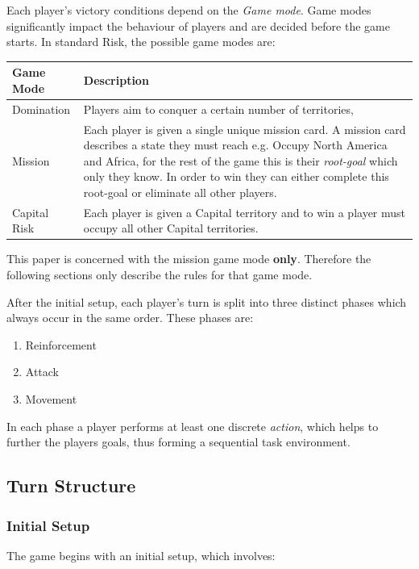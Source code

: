 \documentclass[parskip]{cs4rep}
\begin{document}
Each player’s victory conditions depend on the \textit{Game mode}. Game modes significantly impact the behaviour of players and are decided before the game starts. In standard Risk, the possible game modes are:
\newline

\begin{tabular}{|l|p{11cm}|}
\hline 
\textbf{Game Mode} & \textbf{Description} \\ 
\hline 
Domination & Players aim to conquer a certain number of territories, \\ 
\hline 
Mission & Each player is given a single unique mission card. A mission card describes a state they must reach e.g. Occupy North America and Africa, for the rest of the game this is their \textit{root-goal} which only they know. In order to win they can either complete this root-goal or eliminate all other players. \\ 
\hline 
Capital Risk & Each player is given a Capital territory and to win a player must occupy all other Capital territories. \\ 
\hline
\end{tabular} 

This paper is concerned with the mission game mode \textbf{only}. Therefore the following sections only describe the rules for that game mode. 

After the initial setup, each player's turn is split into three distinct phases which always occur in the same order. These phases are:

\begin{enumerate}
\item
Reinforcement
\item
Attack
\item
Movement
\end{enumerate}

In each phase a player performs at least one discrete \textit{action}, which helps to further the players goals, thus forming a sequential task environment.

\subsection{Turn Structure}

\subsubsection{Initial Setup}

The game begins with an initial setup, which involves:
\end{document}
